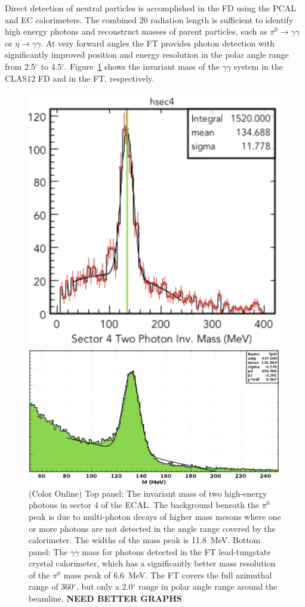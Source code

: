 \documentclass[final,3p,twocolumn]{elsarticle}
\begin{document}
Direct detection of neutral particles is accomplished in the FD using the PCAL and EC calorimeters. The combined
20 radiation length is sufficient to identify high energy photons and reconstruct masses of parent particles, such
as $\pi^0\to \gamma \gamma$  or $\eta \to \gamma \gamma$. At very forward angles the FT provides photon
detection with significantly improved position and energy resolution in the polar angle range from 2.5$^\circ$ to
4.5$^\circ$. Figure~\ref{gg} shows the invariant mass of the $\gamma\gamma$ system in the CLAS12 FD and in
the FT, respectively. 

\begin{figure}[htbp!]
\centerline{\includegraphics[width=0.95\columnwidth]{pi0.png}}
\centerline{\includegraphics[width=0.9\columnwidth]{ft-pi0.png}}
\caption{(Color Online) Top panel: The invariant mass of two high-energy photons in sector 4 of the ECAL. The background beneath
the $\pi^0$ peak is due to multi-photon decays of higher mass mesons where one or more photons are not detected
in the angle range covered by the calorimeter. The widths of the mass peak is 11.8~MeV. Bottom panel: The
$\gamma\gamma$ mass for photons detected in the FT lead-tungstate crystal calorimeter, which has a significantly
better mass resolution of the $\pi^0$ mass peak of 6.6~MeV. The FT covers the full azimuthal range of 360$^\circ$, 
but only a 2.0$^\circ$ range in polar angle range around the beamline. {\bf NEED BETTER GRAPHS}} 
\label{gg}
\end{figure}
\end{document}
